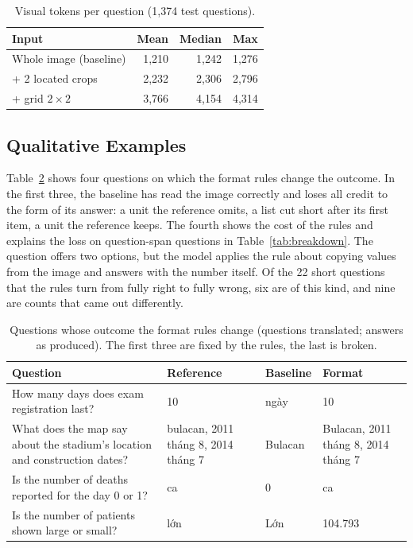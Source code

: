 \documentclass[conference]{IEEEtran}
\newcommand{\vi}[1]{{\fontencoding{T5}\selectfont #1}}
\newcommand{\vi}[1]{#1}
\begin{document}
\begin{table}[t]
\caption{Visual tokens per question (1{,}374 test questions).}
\label{tab:cost}
\centering
\begin{tabular}{lrrr}
\toprule
Input & Mean & Median & Max \\
\midrule
Whole image (baseline) & 1{,}210 & 1{,}242 & 1{,}276 \\
+ 2 located crops      & 2{,}232 & 2{,}306 & 2{,}796 \\
+ grid $2\times2$      & 3{,}766 & 4{,}154 & 4{,}314 \\
\bottomrule
\end{tabular}
\end{table}

\subsection{Qualitative Examples}
Table~\ref{tab:examples} shows four questions on which the format rules change the outcome. In the first three, the baseline has read the image correctly and loses all credit to the form of its answer: a unit the reference omits, a list cut short after its first item, a unit the reference keeps. The fourth shows the cost of the rules and explains the loss on question-span questions in Table~\ref{tab:breakdown}. The question offers two options, but the model applies the rule about copying values from the image and answers with the number itself. Of the 22 short questions that the rules turn from fully right to fully wrong, six are of this kind, and nine are counts that came out differently.

\begin{table}[t]
\caption{Questions whose outcome the format rules change (questions translated; answers as produced). The first three are fixed by the rules, the last is broken.}
\label{tab:examples}
\centering
\small
\begin{tabular}{p{}p{}p{}p{}}
\toprule
Question & Reference & Baseline & Format \\
\midrule
How many days does exam registration last? & 10 & \vi{10 ngày} & 10 \\
\addlinespace
What does the map say about the stadium's location and construction dates? & \vi{bulacan, 2011 tháng 8, 2014 tháng 7} & Bulacan & \vi{Bulacan, 2011 tháng 8, 2014 tháng 7} \\
\addlinespace
Is the number of deaths reported for the day 0 or 1? & \vi{0 ca} & 0 & \vi{0 ca} \\
\addlinespace
Is the number of patients shown large or small? & \vi{lớn} & \vi{Lớn} & 104.793 \\
\bottomrule
\end{tabular}
\end{table}
\end{document}

